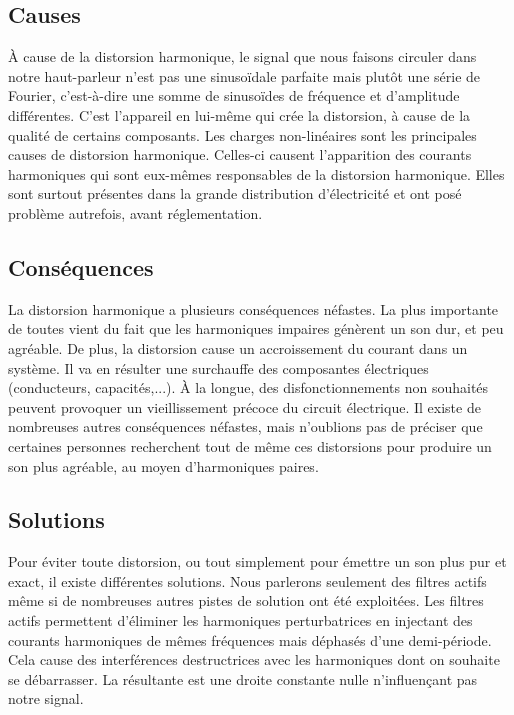 \subsection{Causes}
À cause de la distorsion harmonique, le signal que nous faisons circuler dans notre haut-parleur n'est pas
une sinusoïdale parfaite mais plutôt une série de Fourier, c'est-à-dire une somme de sinusoïdes de 
fréquence et d'amplitude différentes. C'est l'appareil en lui-même qui crée la distorsion, à cause de la qualité
de certains composants.
Les charges non-linéaires sont les principales causes de distorsion harmonique. Celles-ci causent 
l'apparition des courants harmoniques qui sont eux-mêmes responsables de la distorsion harmonique. Elles sont 
surtout présentes dans la grande distribution d'électricité et ont posé problème autrefois, avant réglementation.

\subsection{Conséquences}
La distorsion harmonique a plusieurs conséquences néfastes.
La plus importante de toutes vient du fait que les harmoniques impaires génèrent un son dur, et peu agréable. De plus, la distorsion cause un accroissement 
du courant dans un système. Il va en résulter une surchauffe des composantes électriques (conducteurs, 
capacités,...). À la longue, des disfonctionnements non souhaités peuvent provoquer un vieillissement 
précoce du circuit électrique. Il existe de nombreuses autres conséquences néfastes, mais n'oublions pas de préciser que certaines personnes recherchent tout de même ces distorsions pour produire un son plus agréable, au moyen d'harmoniques paires.

\subsection{Solutions}
Pour éviter toute distorsion, ou tout simplement pour émettre un son plus pur et exact, 
il existe différentes solutions. Nous parlerons seulement des filtres actifs 
même si de nombreuses autres pistes de solution ont été exploitées.
Les filtres actifs permettent d'éliminer les harmoniques perturbatrices en injectant des courants
harmoniques de mêmes fréquences mais déphasés d'une demi-période. Cela cause des interférences
destructrices avec les harmoniques dont on souhaite se débarrasser. La résultante est une droite constante
nulle n'influençant pas notre signal.


